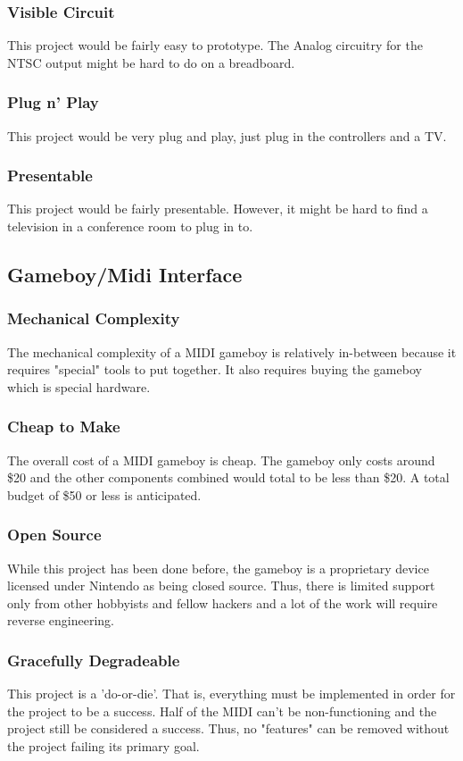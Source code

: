 \documentclass{article}
\begin{document}
\subsubsection{Visible Circuit}
This project would be fairly easy to prototype. The Analog circuitry
for the NTSC output might be hard to do on a breadboard. 
\subsubsection{Plug n' Play}
This project would be very plug and play, just plug in the controllers and a TV.
\subsubsection{Presentable}
This project would be fairly presentable. However, it might be hard to
find a television in a conference room to plug in to. 

\subsection{Gameboy/Midi Interface}
\subsubsection {Mechanical Complexity}
The mechanical complexity of a MIDI gameboy is relatively in-between
because it requires "special" tools to put together. It also requires
buying the gameboy which is special hardware.
\subsubsection{Cheap to Make}
The overall cost of a MIDI gameboy is cheap. The gameboy only costs
around \$20 and the other components combined would total to be less
than \$20. A total budget of \$50 or less is anticipated.
\subsubsection{Open Source}
While this project has been done before, the gameboy is a proprietary
device licensed under Nintendo as being closed source. Thus, there is
limited support only from other hobbyists and fellow hackers and a lot
of the work will require reverse engineering.
\subsubsection{Gracefully Degradeable}
This project is a 'do-or-die'. That is, everything must be implemented
in order for the project to be a success. Half of the MIDI can't be
non-functioning and the project still be considered a success. Thus,
no "features" can be removed without the project failing its primary
goal.
\end{document}
